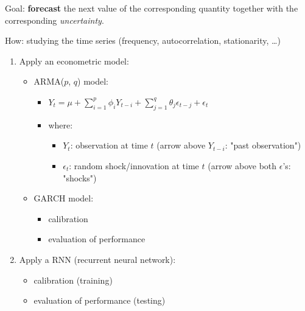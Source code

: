 \documentclass[11pt,a4paper]{article}
\theoremstyle{definition}
\theoremstyle{plain}
\theoremstyle{remark}
\begin{document}
Goal: \textbf{forecast} the next value of the corresponding quantity together with the corresponding \emph{uncertainty}.

How: studying the time series (frequency, autocorrelation, stationarity, \dots)
\begin{enumerate}
    \item Apply an econometric model:
    \begin{itemize}
        \item ARMA($p$, $q$) model:
        \begin{itemize}
            \item $Y_t = \mu + \sum_{i=1}^p \phi_i Y_{t-i} + \sum_{j=1}^q \theta_j \epsilon_{t-j} + \epsilon_t$
            \item where:
            \begin{itemize}
                \item $Y_t$: observation at time $t$ (arrow above $Y_{t-i}$: "past observation")
                \item $\epsilon_t$: random shock/innovation at time $t$ (arrow above both $\epsilon$'s: "shocks")
            \end{itemize}
        \end{itemize}
        \item GARCH model:
        \begin{itemize}
            \item calibration
            \item evaluation of performance
        \end{itemize}
    \end{itemize}
    \item Apply a RNN (recurrent neural network):
    \begin{itemize}
        \item calibration (training)
        \item evaluation of performance (testing)
    \end{itemize}
\end{enumerate}
\end{document}
